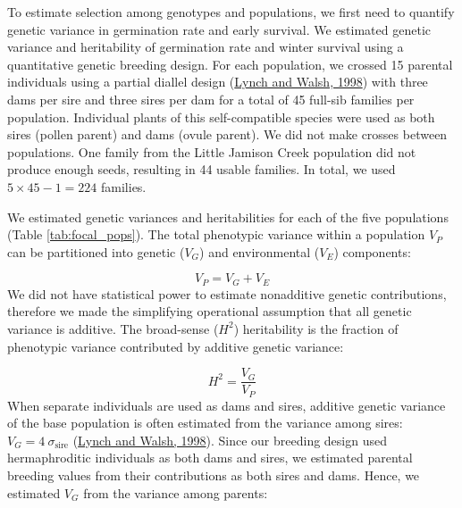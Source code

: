 \documentclass[
  12pt,
]{article}
\begin{document}
To estimate selection among genotypes and populations, we first need to quantify genetic variance in germination rate and early survival. We estimated genetic variance and heritability of germination rate and winter survival using a quantitative genetic breeding design. For each population, we crossed 15 parental individuals using a partial diallel design (\protect\hyperlink{ref-lynch_genetics_1998}{Lynch and Walsh, 1998}) with three dams per sire and three sires per dam for a total of 45 full-sib families per population. Individual plants of this self-compatible species were used as both sires (pollen parent) and dams (ovule parent). We did not make crosses between populations. One family from the Little Jamison Creek population did not produce enough seeds, resulting in 44 usable families. In total, we used \(5 \times 45 - 1 = 224\) families.

We estimated genetic variances and heritabilities for each of the five populations (Table \ref{tab:focal_pops}). The total phenotypic variance within a population \(V_P\) can be partitioned into genetic (\(V_G\)) and environmental (\(V_E\)) components:

\[V_P = V_G + V_E\]
We did not have statistical power to estimate nonadditive genetic contributions, therefore we made the simplifying operational assumption that all genetic variance is additive. The broad-sense (\(H^2\)) heritability is the fraction of phenotypic variance contributed by additive genetic variance:

\[H ^ 2 = \frac{V_G}{V_P}\]
When separate individuals are used as dams and sires, additive genetic variance of the base population is often estimated from the variance among sires: \(V_G = 4~\sigma_{\mathrm{sire}}\) (\protect\hyperlink{ref-lynch_genetics_1998}{Lynch and Walsh, 1998}). Since our breeding design used hermaphroditic individuals as both dams and sires, we estimated parental breeding values from their contributions as both sires and dams. Hence, we estimated \(V_G\) from the variance among parents:
\end{document}
